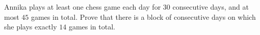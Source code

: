 Annika plays at least one chess game each day for \(30\) consecutive days, and at most \(45\) games in total. Prove that there is a block of consecutive days on which she plays exactly \(14\) games in total.

